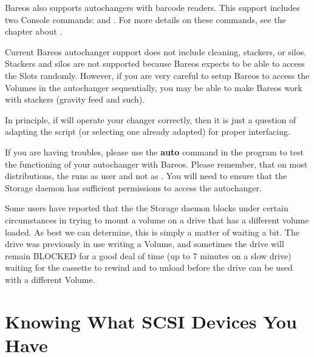 Bareos also supports autochangers with barcode
readers. This support includes two Console commands: 
and . For more details on these commands, see the chapter about .

Current Bareos autochanger support does not include cleaning, stackers, or
silos. Stackers and silos are not supported because Bareos expects to
be able to access the Slots randomly.
However, if you are very careful to setup Bareos to access the Volumes
in the autochanger sequentially, you may be able to make Bareos
work with stackers (gravity feed and such).

In principle, if  will operate your changer correctly, then it is
just a question of adapting the  script (or selecting one
already adapted) for proper interfacing.



If you are having troubles,
please use the {\bf auto} command in the  program
to test the functioning of your autochanger with Bareos.
Please remember, that on most distributions, the \bareosSd
runs as user  and not as .
You will need to ensure that the Storage daemon has sufficient
permissions to access the autochanger.

Some users have reported that the the Storage daemon blocks under certain
circumstances in trying to mount a volume on a drive that has a different
volume loaded.  As best we can determine, this is simply a matter of
waiting a bit.  The drive was previously in use writing a Volume, and
sometimes the drive will remain BLOCKED for a good deal of time (up to 7
minutes on a slow drive) waiting for the cassette to rewind and to unload
before the drive can be used with a different Volume.

\section{Knowing What SCSI Devices You Have}
\label{SCSI devices}

